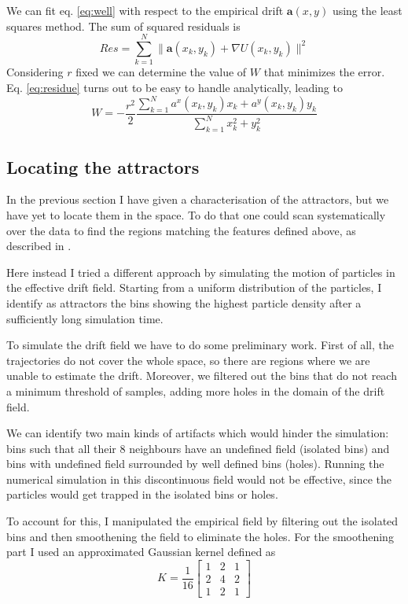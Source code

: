 \documentclass[a4paper]{article}
\begin{document}
We can fit eq. \ref{eq:well} with respect to the empirical drift $\bm{a}(x, y)$ using the least squares method. The sum of squared residuals is
\begin{equation} \label{eq:residue}
Res = \sum_{k = 1}^N \| \bm{a}(x_k, y_k) + \nabla U(x_k, y_k) \|^2
\end{equation}
Considering $r$ fixed we can determine the value of $W$ that minimizes the error. Eq. \ref{eq:residue} turns out to be easy to handle analytically, leading to
\begin{equation}
W = - \frac{r^2}{2} \frac{\sum_{k = 1}^N a^x(x_k, y_k) x_k + a^y(x_k, y_k) y_k}{\sum_{k = 1}^N x_k^2 + y_k^2}
\end{equation}

\subsection{Locating the attractors}
\label{sec:attractors}

In the previous section I have given a characterisation of the attractors, but we have yet to locate them in the space. To do that one could scan systematically over the data to find the regions matching the features defined above, as described in \cite{hoze2012}.

Here instead I tried a different approach by simulating the motion of particles in the effective drift field. Starting from a uniform distribution of the particles, I identify as attractors the bins showing the highest particle density after a sufficiently long simulation time.

To simulate the drift field we have to do some preliminary work. First of all, the trajectories do not cover the whole space, so there are regions where we are unable to estimate the drift. Moreover, we filtered out the bins that do not reach a minimum threshold of samples, adding more holes in the domain of the drift field.

We can identify two main kinds of artifacts which would hinder the simulation: bins such that all their 8 neighbours have an undefined field (isolated bins) and bins with undefined field surrounded by well defined bins (holes). Running the numerical simulation in this discontinuous field would not be effective, since the particles would get trapped in the isolated bins or holes.

To account for this, I manipulated the empirical field by filtering out the isolated bins and then smoothening the field to eliminate the holes. For the smoothening part I used an approximated Gaussian kernel defined as
\begin{equation} \label{eq:kernel}
K = \frac{1}{16} \begin{bmatrix} 1 & 2 & 1 \\ 2 & 4 & 2 \\ 1 & 2 & 1\end{bmatrix}
\end{equation}
\end{document}
